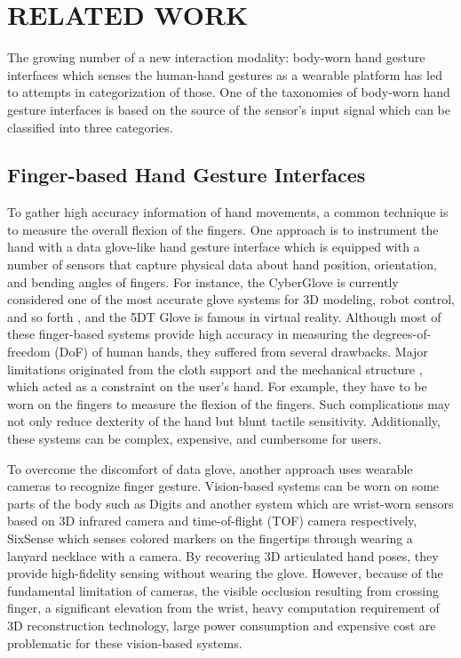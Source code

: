 \documentclass{sigchi}
\begin{document}
\section{RELATED WORK}

The growing number of a new interaction modality: body-worn hand gesture interfaces which senses the human-hand gestures as a wearable platform has led to attempts in categorization of those. One of the taxonomies of body-worn hand gesture interfaces is based on the source of the sensor's input signal which can be classified into three categories.

\subsection{Finger-based Hand Gesture Interfaces}
To gather high accuracy information of hand movements, a common technique is to measure the overall flexion of the fingers. One approach is to instrument the hand with a data glove-like hand gesture interface \cite{4539650, 1546364, 806717, tsukada2001ubi} which is equipped with a number of sensors that capture physical data about hand position, orientation, and bending angles of fingers.
For instance, the CyberGlove \cite{1414484} is currently considered one of the most accurate glove systems for 3D modeling, robot control, and so forth \cite{Burdea:2003:VRT:829566, LaViola:1999:SHP:864649}, and the 5DT Glove \cite{5DT} is famous in virtual reality. 
Although most of these finger-based systems provide high accuracy in measuring the degrees-of-freedom (DoF) of human hands, they suffered from several drawbacks. 
Major limitations originated from the cloth support and the mechanical structure \cite{4539650}
, which acted as a constraint on the user’s hand. For example, they have to be worn on the fingers to measure the flexion of the fingers. Such complications may not only reduce dexterity of the hand but blunt tactile sensitivity. Additionally, these systems can be complex, expensive, and cumbersome for users.

To overcome the discomfort of data glove, another approach uses wearable cameras to recognize finger gesture. Vision-based systems can be worn on some parts of the body such as Digits \cite{Kim:2012:DFI:2380116.2380139} and another system \cite{6855631} which are wrist-worn sensors based on 3D infrared camera and time-of-flight (TOF) camera respectively, SixSense\cite{Mistry:2009:SWG:1667146.1667160} which senses colored markers on the fingertips through wearing a lanyard necklace with a camera. By recovering 3D articulated hand poses, they provide high-fidelity sensing without wearing the glove. However, because of the fundamental limitation of cameras, the visible occlusion resulting from crossing finger, a significant elevation from the wrist, heavy computation requirement of 3D reconstruction technology, large power consumption and expensive cost are problematic for these vision-based systems.
\end{document}
